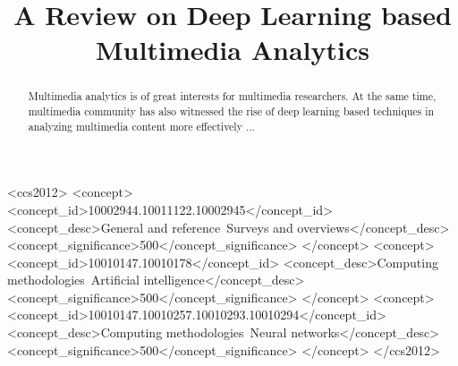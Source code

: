 \documentclass[format=acmsmall, review=false, screen=true]{acmart}
\begin{document}
\title[A Review on Deep Learning based Multimedia Analytics]{A Review on Deep Learning based Multimedia Analytics}




\begin{abstract}
Multimedia analytics is of great interests for multimedia researchers. At the same time, multimedia community has also witnessed the rise of deep learning based techniques in analyzing multimedia content more effectively ... 

\end{abstract}


%
%
\begin{CCSXML}
	<ccs2012>
	<concept>
	<concept_id>10002944.10011122.10002945</concept_id>
	<concept_desc>General and reference~Surveys and overviews</concept_desc>
	<concept_significance>500</concept_significance>
	</concept>
	<concept>
	<concept_id>10010147.10010178</concept_id>
	<concept_desc>Computing methodologies~Artificial intelligence</concept_desc>
	<concept_significance>500</concept_significance>
	</concept>
	<concept>
	<concept_id>10010147.10010257.10010293.10010294</concept_id>
	<concept_desc>Computing methodologies~Neural networks</concept_desc>
	<concept_significance>500</concept_significance>
	</concept>
	</ccs2012>
\end{CCSXML}
\end{document}
